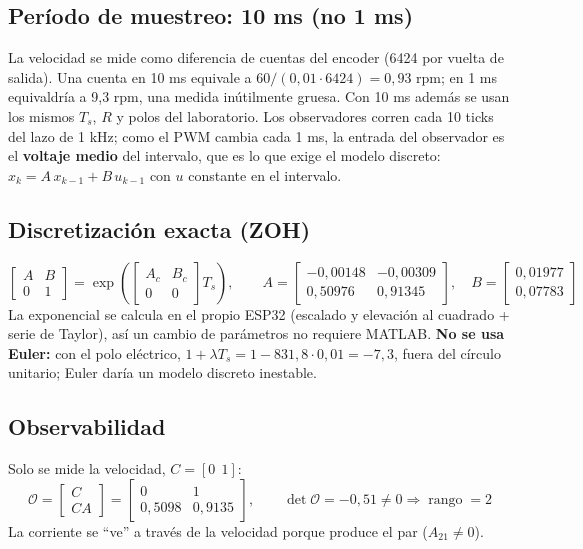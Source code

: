 \documentclass[11pt]{article}
\begin{document}
\subsection*{Período de muestreo: 10 ms (no 1 ms)}
La velocidad se mide como diferencia de cuentas del encoder (6424 por vuelta de salida). Una cuenta en 10 ms equivale a $60/(0{,}01\cdot6424)=0{,}93$ rpm; en 1 ms equivaldría a 9,3 rpm, una medida inútilmente gruesa. Con 10 ms además se usan los mismos $T_s$, $R$ y polos del laboratorio. Los observadores corren cada 10 ticks del lazo de 1 kHz; como el PWM cambia cada 1 ms, la entrada del observador es el \textbf{voltaje medio} del intervalo, que es lo que exige el modelo discreto: $x_k=A\,x_{k-1}+B\,u_{k-1}$ con $u$ constante en el intervalo.

\subsection*{Discretización exacta (ZOH)}
\begin{equation}
\begin{bmatrix}A & B\\ 0 & 1\end{bmatrix}=\exp\!\left(\begin{bmatrix}A_c & B_c\\ 0 & 0\end{bmatrix}T_s\right),\qquad
A=\begin{bmatrix}-0{,}00148 & -0{,}00309\\ 0{,}50976 & 0{,}91345\end{bmatrix},\quad B=\begin{bmatrix}0{,}01977\\ 0{,}07783\end{bmatrix}
\end{equation}
La exponencial se calcula en el propio ESP32 (escalado y elevación al cuadrado + serie de Taylor), así un cambio de parámetros no requiere MATLAB. \textbf{No se usa Euler:} con el polo eléctrico, $1+\lambda T_s=1-831{,}8\cdot0{,}01=-7{,}3$, fuera del círculo unitario; Euler daría un modelo discreto inestable.

\subsection*{Observabilidad}
Solo se mide la velocidad, $C=[0\ \ 1]$:
\begin{equation}
\mathcal O=\begin{bmatrix}C\\ CA\end{bmatrix}=\begin{bmatrix}0 & 1\\ 0{,}5098 & 0{,}9135\end{bmatrix},\qquad \det\mathcal O=-0{,}51\neq0 \Rightarrow \operatorname{rango}=2
\end{equation}
La corriente se ``ve'' a través de la velocidad porque produce el par ($A_{21}\neq0$).
\end{document}
